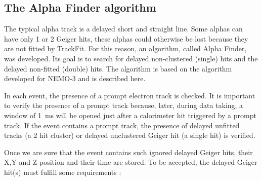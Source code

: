 \documentclass[main.tex]{subfiles}
\begin{document}
\subsection{The Alpha Finder algorithm}


\noindent The typical alpha track is a delayed short and straight line. Some alphas can have only 1 or 2 Geiger hits, these alphas could otherwise be lost because they are not fitted by TrackFit. For this reason, an algorithm, called Alpha Finder, was developed. Its goal is to search for delayed non-clustered (single) hits and the delayed non-fitted (double) hits. The algorithm is based on the algorithm developed for NEMO-3 and is described here. %


\bigskip


\noindent In each event, the presence of a prompt electron track is checked. It is important to verify the presence of a prompt track because, later, during data taking, a window of 1~ms will be opened just after a calorimeter hit triggered by a prompt track. If the event contains a prompt track, the presence of delayed unfitted tracks (a 2 hit cluster) or delayed unclustered Geiger hit (a single hit) is verified.


\bigskip


\noindent Once we are sure that the event contains such ignored delayed Geiger hits, their X,Y and Z position and their time are stored. To be accepted, the delayed Geiger hit(s) must fulfill some requirements :
\end{document}
